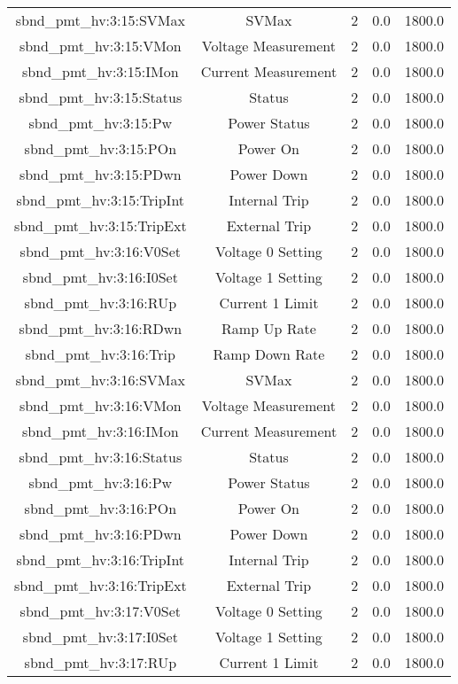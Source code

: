 \begin{table}[ptb]
\begin{tabular}{c | c c c c}
sbnd_pmt_hv:3:15:SVMax & SVMax & 2 & 0.0 & 1800.0\\ 
sbnd_pmt_hv:3:15:VMon & Voltage Measurement & 2 & 0.0 & 1800.0\\ 
sbnd_pmt_hv:3:15:IMon & Current Measurement & 2 & 0.0 & 1800.0\\ 
sbnd_pmt_hv:3:15:Status & Status & 2 & 0.0 & 1800.0\\ 
sbnd_pmt_hv:3:15:Pw & Power Status & 2 & 0.0 & 1800.0\\ 
sbnd_pmt_hv:3:15:POn & Power On & 2 & 0.0 & 1800.0\\ 
sbnd_pmt_hv:3:15:PDwn & Power Down & 2 & 0.0 & 1800.0\\ 
sbnd_pmt_hv:3:15:TripInt & Internal Trip & 2 & 0.0 & 1800.0\\ 
sbnd_pmt_hv:3:15:TripExt & External Trip & 2 & 0.0 & 1800.0\\ 
sbnd_pmt_hv:3:16:V0Set & Voltage 0 Setting & 2 & 0.0 & 1800.0\\ 
sbnd_pmt_hv:3:16:I0Set & Voltage 1 Setting & 2 & 0.0 & 1800.0\\ 
sbnd_pmt_hv:3:16:RUp & Current 1 Limit & 2 & 0.0 & 1800.0\\ 
sbnd_pmt_hv:3:16:RDwn & Ramp Up Rate & 2 & 0.0 & 1800.0\\ 
sbnd_pmt_hv:3:16:Trip & Ramp Down Rate & 2 & 0.0 & 1800.0\\ 
sbnd_pmt_hv:3:16:SVMax & SVMax & 2 & 0.0 & 1800.0\\ 
sbnd_pmt_hv:3:16:VMon & Voltage Measurement & 2 & 0.0 & 1800.0\\ 
sbnd_pmt_hv:3:16:IMon & Current Measurement & 2 & 0.0 & 1800.0\\ 
sbnd_pmt_hv:3:16:Status & Status & 2 & 0.0 & 1800.0\\ 
sbnd_pmt_hv:3:16:Pw & Power Status & 2 & 0.0 & 1800.0\\ 
sbnd_pmt_hv:3:16:POn & Power On & 2 & 0.0 & 1800.0\\ 
sbnd_pmt_hv:3:16:PDwn & Power Down & 2 & 0.0 & 1800.0\\ 
sbnd_pmt_hv:3:16:TripInt & Internal Trip & 2 & 0.0 & 1800.0\\ 
sbnd_pmt_hv:3:16:TripExt & External Trip & 2 & 0.0 & 1800.0\\ 
sbnd_pmt_hv:3:17:V0Set & Voltage 0 Setting & 2 & 0.0 & 1800.0\\ 
sbnd_pmt_hv:3:17:I0Set & Voltage 1 Setting & 2 & 0.0 & 1800.0\\ 
sbnd_pmt_hv:3:17:RUp & Current 1 Limit & 2 & 0.0 & 1800.0\\ 

\end{tabular}
\end{table}
